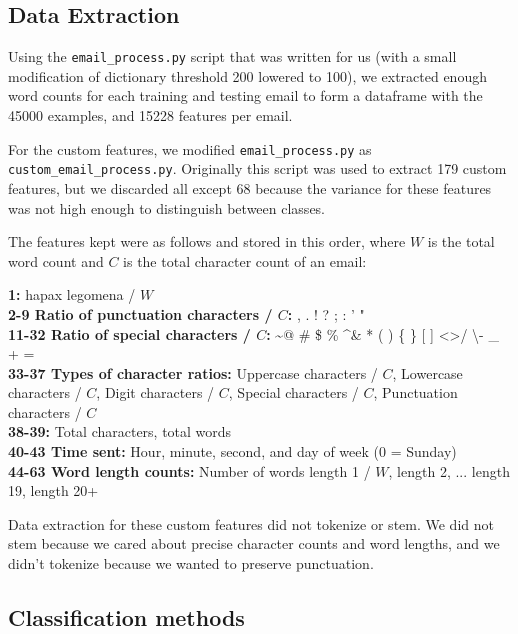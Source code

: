 \documentclass{article} %
\begin{document}
\subsection*{Data Extraction}
\par
Using the  \lstinline{email_process.py}\lstinline{} script that was written for us (with a small modification of dictionary threshold 200 lowered to 100), we extracted enough word counts for each training and testing email to form a dataframe with the 45000 examples, and 15228 features per email.\par 
For the custom features, we modified \lstinline|email_process.py| as \lstinline|custom_email_process.py|. Originally this script was used to extract 179 custom features, but we discarded all except 68 because the variance for these features was not high enough to distinguish between classes. \par
The features kept were as follows and stored in this order, where $W$ is the total word count and $C$ is the total character count of an email:\par 
\textbf{1:} hapax legomena / $W$\\
\textbf{2-9 Ratio of punctuation characters / $C$: }  , . ! ? ; : ' "\\
\textbf{11-32 Ratio of special characters / $C$:} \textasciitilde @ \# \$ \% \textasciicircum \& * ( ) \{ \} [ ] \textless \textgreater / \textbackslash - \_ + =\\
\textbf{33-37 Types of character ratios:} Uppercase characters / $C$, Lowercase characters / $C$, Digit characters / $C$, Special characters / $C$, Punctuation characters / $C$\\
\textbf{38-39:} Total characters, total words\\
\textbf{40-43 Time sent: } Hour, minute, second, and day of week (0 = Sunday)\\
\textbf{44-63 Word length counts:} Number of words length 1 / $W$, length 2, ... length 19, length 20+

Data extraction for these custom features did not tokenize or stem. We did not stem because we cared about precise character counts and word lengths, and we didn't tokenize because we wanted to preserve punctuation.\\


\subsection{Classification methods}
\end{document}
